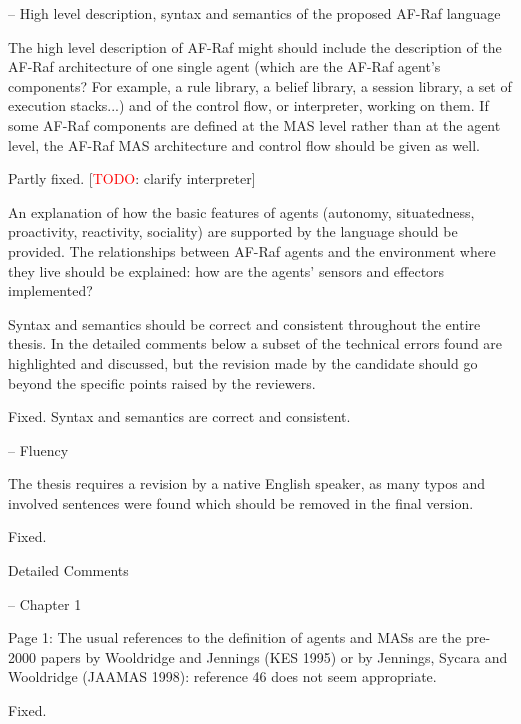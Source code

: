 \documentclass{article}
\newcommand{\todo}[1]{[\textcolor{red}{TODO}: #1]}
\newenvironment{them}{\noindent\begingroup\color{blue}}{\endgroup\par}
\begin{document}
\begin{them}

-- High level description, syntax and semantics of the proposed AF-Raf language

The high level description of AF-Raf might should include the description of the AF-Raf architecture of one single agent (which are the AF-Raf agent's components? For example, a rule library, a belief library, a session library, a set of execution stacks...) and of the control flow, or interpreter, working on them. If some AF-Raf components are defined at the MAS level rather than at the agent level, the AF-Raf MAS architecture and control flow should be given as well.
\end{them}
Partly fixed.
\todo{clarify interpreter}

\begin{them}

An explanation of how the basic features of agents (autonomy, situatedness, proactivity, reactivity, sociality) are supported by the language should be provided. The relationships between AF-Raf agents and the environment where they live should be explained: how are the agents' sensors and effectors implemented? 
\end{them}
\todo{clarify this}

\begin{them}

Syntax and semantics should be correct and consistent throughout the entire thesis. In the detailed comments below a subset of the technical errors found are highlighted and discussed, but the revision made by the candidate should go beyond the specific points raised by the reviewers.
\end{them}
Fixed. Syntax and semantics are correct and consistent.

\begin{them}

-- Fluency

The thesis requires a revision by a native English speaker, as many typos and involved sentences were found which should be removed in the final version.
\end{them}
Fixed.

\begin{them}

Detailed Comments

-- Chapter 1

Page 1:
The usual references to the definition of agents and MASs are the pre-2000 papers by Wooldridge
and Jennings (KES 1995) or by Jennings, Sycara and Wooldridge (JAAMAS 1998): reference 46 does
not seem appropriate.
\end{them}
Fixed.
\end{document}
